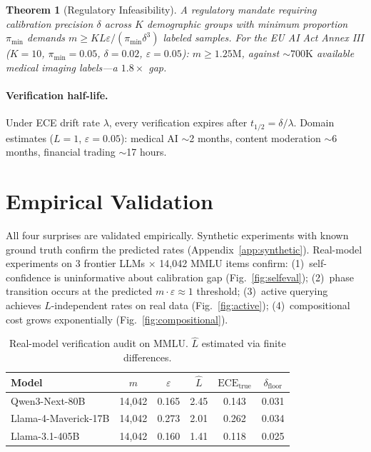 \documentclass{article}
\newcommand{\ECE}{\mathrm{ECE}}
\newcommand{\Lip}{L}
\newcommand{\errrate}{\varepsilon}
\newcommand{\nsamples}{m}
\newcommand{\groupprop}{\pi}
\newcommand{\targetacc}{\delta}
\newcommand{\verfloor}{\delta_{\mathrm{floor}}}
\newcommand{\halflife}{t_{1/2}}
\newcommand{\driftrate}{\lambda}
\newtheorem{theorem}{Theorem}
\theoremstyle{definition}
\begin{document}
\begin{theorem}[Regulatory Infeasibility]
\label{thm:regulatory}
A regulatory mandate requiring calibration precision $\targetacc$ across $K$ demographic groups with minimum proportion $\groupprop_{\min}$ demands $\nsamples \geq K\Lip\errrate / (\groupprop_{\min}\targetacc^3)$ labeled samples. For the EU AI Act Annex III ($K{=}10$, $\groupprop_{\min}{=}0.05$, $\targetacc{=}0.02$, $\errrate{=}0.05$): $\nsamples \geq 1.25\text{M}$, against ${\sim}700\text{K}$ available medical imaging labels---a $1.8\times$ gap.
\end{theorem}



\paragraph{Verification half-life.} Under ECE drift rate $\driftrate$, every verification expires after $\halflife = \targetacc/\driftrate$. Domain estimates ($\Lip{=}1$, $\errrate{=}0.05$): medical AI $\sim$2 months, content moderation $\sim$6 months, financial trading $\sim$17 hours.

\section{Empirical Validation}
\label{sec:empirics}

All four surprises are validated empirically. Synthetic experiments with known ground truth confirm the predicted rates (Appendix~\ref{app:synthetic}). Real-model experiments on 3 frontier LLMs $\times$ 14{,}042 MMLU items confirm: (1)~self-confidence is uninformative about calibration gap (Fig.~\ref{fig:selfeval}); (2)~phase transition occurs at the predicted $\nsamples \cdot \errrate \approx 1$ threshold; (3)~active querying achieves $\Lip$-independent rates on real data (Fig.~\ref{fig:active}); (4)~compositional cost grows exponentially (Fig.~\ref{fig:compositional}).

\begin{table}[t]
\centering
\caption{Real-model verification audit on MMLU. $\hat{\Lip}$ estimated via finite differences.}
\label{tab:real-mmlu}
\small
\begin{tabular}{lccccc}
\toprule
\textbf{Model} & $\nsamples$ & $\errrate$ & $\hat{\Lip}$ & $\ECE_{\mathrm{true}}$ & $\verfloor$ \\
\midrule
Qwen3-Next-80B & 14{,}042 & 0.165 & 2.45 & 0.143 & 0.031 \\
Llama-4-Maverick-17B & 14{,}042 & 0.273 & 2.01 & 0.262 & 0.034 \\
Llama-3.1-405B & 14{,}042 & 0.160 & 1.41 & 0.118 & 0.025 \\
\bottomrule
\end{tabular}
\end{table}
\end{document}
